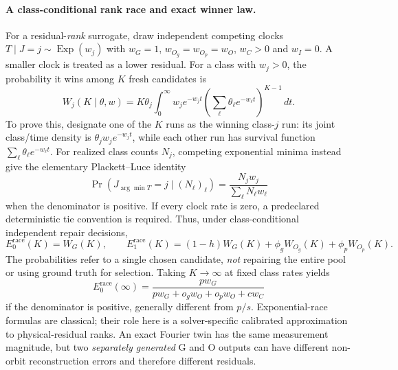 \paragraph{A class-conditional rank race and exact winner law.}
For a residual-\emph{rank} surrogate, draw independent competing
clocks $T\mid J=j\sim\operatorname{Exp}(w_j)$ with
$w_G=1$, $w_{O_g}=w_{O_p}=w_O$, $w_C>0$ and $w_I=0$.
A smaller clock is treated as a lower residual. For a class with
$w_j>0$, the probability it wins among $K$ fresh candidates is
\begin{equation}\label{eq:suppl-race-integral}
 W_j(K\mid\theta,w)
 =K\theta_j\int_0^\infty w_j e^{-w_jt}
 \left(\sum_\ell\theta_\ell e^{-w_\ell t}\right)^{K-1}\,dt.
\end{equation}
To prove this, designate one of the $K$ runs as the winning class-$j$
run: its joint class/time density is $\theta_j w_j e^{-w_jt}$,
while each other run has survival function
$\sum_\ell\theta_\ell e^{-w_\ell t}$.
For realized class counts $N_j$, competing exponential minima
instead give the elementary Plackett--Luce identity
\begin{equation}\label{eq:suppl-race-conditional}
 \Pr(J_{\arg\min T}=j\mid (N_\ell)_\ell)
 =\frac{N_jw_j}{\sum_\ell N_\ell w_\ell}
\end{equation}
when the denominator is positive. If every clock rate is zero, a
predeclared deterministic tie convention is required. Thus, under
class-conditional independent repair decisions,
\begin{equation}\label{eq:suppl-race-policies}
 E_0^{\mathrm{race}}(K)=W_G(K),\qquad
 E_1^{\mathrm{race}}(K)=(1-h)W_G(K)
 +\phi_gW_{O_g}(K)+\phi_pW_{O_p}(K).
\end{equation}
The probabilities refer to a single chosen candidate, \emph{not}
repairing the entire pool or using ground truth for selection.
Taking $K\to\infty$ at fixed class rates yields
\[
 E_0^{\mathrm{race}}(\infty)
 =\frac{p w_G}{p w_G+o_gw_O+o_pw_O+cw_C}
\]
if the denominator is positive, generally different from $p/s$.
Exponential-race formulas are classical; their role here is a
solver-specific calibrated approximation to physical-residual ranks.
An exact Fourier twin has the same measurement magnitude, but two
\emph{separately generated} G and O outputs can have different
non-orbit reconstruction errors and therefore different residuals.

